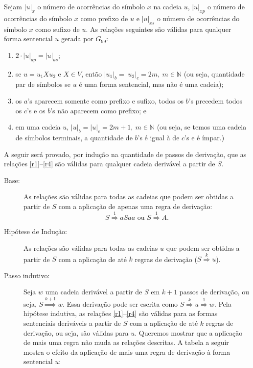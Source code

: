 \documentclass[12pt]{article}
\def\myling{{99}} %
\newcommand{\deriv}[1]{\stackrel{\scriptscriptstyle #1}{\Longrightarrow}}
\begin{document}
\begin{tcolorbox}[breakable,rounded corners, colback=yellow!5, colframe=red!40!black, title={$\mathcal{L}(G_{99})\subseteq \mathcal{L}_{\myling}$, ou seja, se $S \deriv{*} w$, então $w = a^nb^{2m+1}c^{2m+1}a^{2n},\ n,m \geqslant 0$.}]
Sejam $|u|_x$ o número de ocorrências do símbolo $x$ na cadeia $u$, $|u|_{xp}$ o número de ocorrências do símbolo $x$ como prefixo de $u$ e $|u|_{xs}$ o número de ocorrências do símbolo $x$ como sufixo de $u$.
 As relações seguintes são válidas para qualquer forma sentencial $u$ gerada por $G_{99}$:
\begin{enumerate}[label=(\roman*),ref=(\roman*)]
	\item \label{r1} $2\cdot |u|_{ap} = |u|_{as}$;
	\item \label{r2} se $u=u_1Xu_2$ e $X \in V$, então $|u_1|_{b}=|u_2|_{c}=2m,\ m \in \mathbb{N}$ (ou seja, quantidade par de símbolos se $u$ é uma forma sentencial, mas não é uma cadeia);
	\item \label{r3} os $a$'s aparecem somente como prefixo e sufixo, todos os $b$'s precedem todos os $c$'s e os $b$'s não aparecem como prefixo; e
	\item \label{r4} em uma cadeia $u$, $|u|_{b}=|u|_{c}= 2m+1, \ m \in \mathbb{N}$ (ou seja, se temos uma cadeia de símbolos terminais, a quantidade de $b$'s é igual à de $c$'s e é ímpar.)
\end{enumerate}
 A seguir será provado, por indução na quantidade de passos de derivação, que as relações \ref{r1}--\ref{r4} são válidas para qualquer cadeia derivável a partir de $S$.
\begin{description}
	\item[Base:] As relações são válidas para todas as cadeias que podem ser obtidas a partir de $S$ com a aplicação de apenas uma regra de derivação: 
	$$S \deriv{1} aSaa\text{ ou }S \deriv{1} A.$$	
	\item[Hipótese de Indução:] As relações são válidas para todas as cadeias $u$ que podem ser obtidas a partir de $S$ com a aplicação de até $k$ regras de derivação ($S \deriv{k}u$).
	\item[Passo indutivo:] Seja $w$ uma cadeia derivável a partir de $S$ em $k+1$ passos de derivação, ou seja, $S \deriv{k+1}w$. Essa derivação pode ser escrita como $S \deriv{k}u \deriv{1}w$. Pela hipótese indutiva, as relações \ref{r1}--\ref{r4} são válidas para as formas sentenciais deriváveis a partir de $S$ com a aplicação de até $k$ regras de derivação, ou seja, são válidas para $u$. Queremos mostrar que a aplicação de mais uma regra não muda as relações descritas. A tabela a seguir mostra o efeito da aplicação de mais uma regra de derivação à forma sentencial $u$:

\end{description}
\end{tcolorbox}
\end{document}
